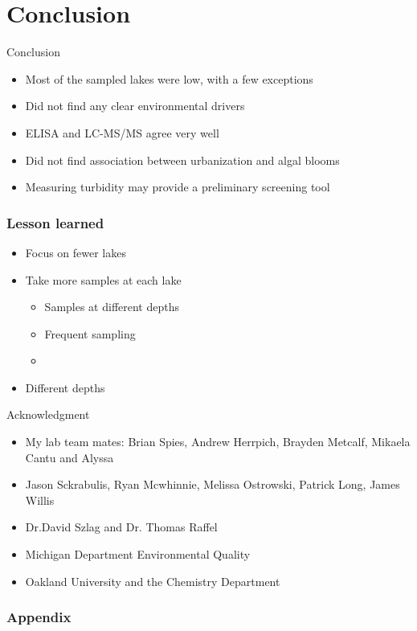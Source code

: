 \section{Conclusion}
\begin{frame}{Conclusion}
	\begin{itemize}
		\item Most of the sampled lakes were low, with a few exceptions 
		\item Did not find any clear environmental drivers 
		\item ELISA and LC-MS/MS agree very well 
		\item Did not find association between urbanization and algal blooms 
		\item Measuring turbidity may provide a preliminary screening tool
	\end{itemize}

	
\end{frame}
\begin{frame}
	\frametitle{Lesson learned}

	\begin{itemize}
		\item Focus on fewer lakes 
		\item Take more samples at each lake 
			\begin{itemize}
				\item Samples at different depths 
				\item Frequent sampling 
				\item 
			\end{itemize}
		\item Different depths
	\end{itemize}

	

\end{frame}


\begin{frame}{Acknowledgment}

	\begin{itemize} 
		\item My lab team mates: Brian Spies, Andrew Herrpich, Brayden Metcalf, Mikaela Cantu and Alyssa
		\item Jason Sckrabulis, Ryan Mcwhinnie, Melissa Ostrowski, Patrick Long, James Willis
		\item Dr.David Szlag and Dr. Thomas Raffel
		\item Michigan Department Environmental Quality
		\item Oakland University and the Chemistry Department
	\end{itemize}

\end{frame}

\begin{frame}
	\frametitle{Appendix}

	

\end{frame}


